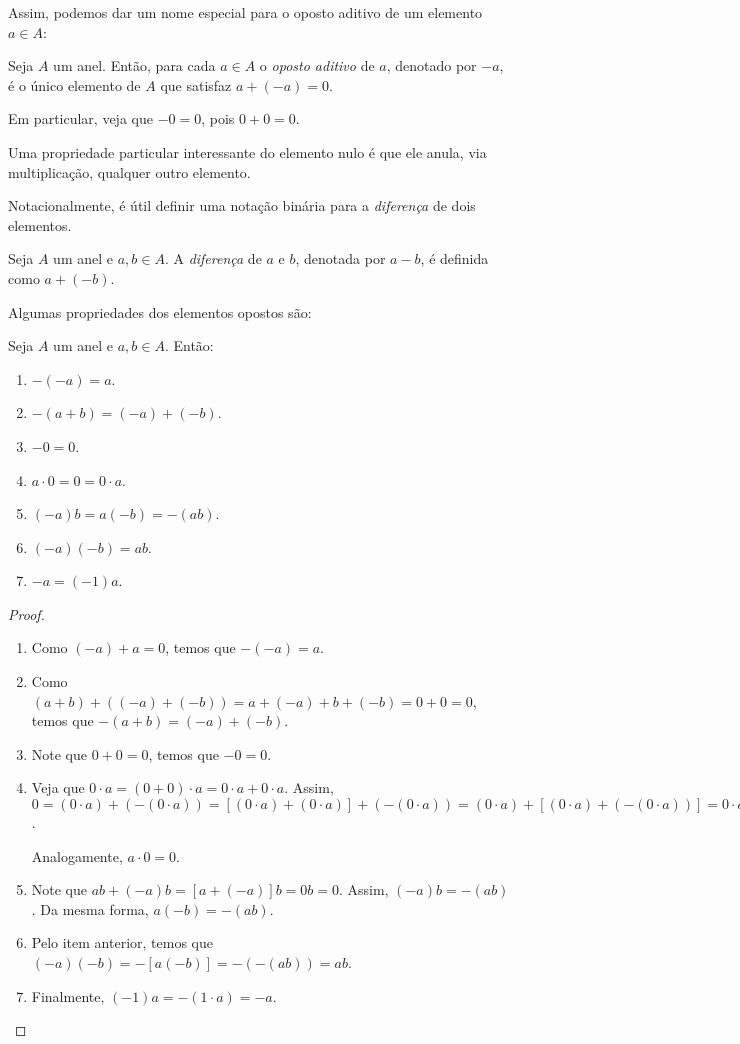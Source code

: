 Assim, podemos dar um nome especial para o oposto aditivo de um elemento $a \in A$:

\begin{definition}
    Seja $A$ um anel.
    Então, para cada $a \in A$ o \emph{oposto aditivo} de $a$, denotado por $-a$, é o único elemento de $A$ que satisfaz $a+(-a)=0$.

    Em particular, veja que $-0=0$, pois $0+0=0$.
\end{definition}


Uma propriedade particular interessante do elemento nulo é que ele anula, via multiplicação, qualquer outro elemento.

Notacionalmente, é útil definir uma notação binária para a \emph{diferença} de dois elementos.

\begin{definition}[Diferença]
    Seja $A$ um anel e $a, b \in A$.
    A \emph{diferença} de $a$ e $b$, denotada por $a-b$, é definida como $a+(-b)$.
\end{definition}
Algumas propriedades dos elementos opostos são:
\begin{proposition}
    Seja $A$ um anel e $a, b \in A$.
    Então:
    \begin{enumerate}[label=(\roman*)]
        \item $-(-a)=a$.
        \item $-(a+b)=(-a)+(-b)$.
        \item $-0=0$.
        \item $a\cdot 0=0=0\cdot a$.
        \item $(-a)b=a(-b)=-(ab)$.
        \item $(-a)(-b)=ab$.
        \item $-a=(-1)a$.
    \end{enumerate}
\end{proposition}
\begin{proof}
        \begin{enumerate}[label=(\roman*)]
        \item Como $(-a)+a=0$, temos que $-(-a)=a$.
        \item Como $(a+b)+((-a)+(-b))=a+(-a)+b+(-b)=0+0=0$, temos que $-(a+b)=(-a)+(-b)$.
        \item Note que $0+0=0$, temos que $-0=0$.
        \item Veja que $0\cdot a=(0+0)\cdot a=0\cdot a+0\cdot a$.
        Assim, $0=(0\cdot a)+(-(0\cdot a))=[(0\cdot a)+(0\cdot a)]+(-(0\cdot a))=(0\cdot a)+[(0\cdot a)+(-(0\cdot a))]=0\cdot a$.

        Analogamente, $a\cdot 0=0$.
        \item Note que $ab+(-a)b=[a+(-a)]b=0b=0$.
        Assim, $(-a)b=-(ab)$.
        Da mesma forma, $a(-b)=-(ab)$.
        \item Pelo item anterior, temos que $(-a)(-b)=-[a(-b)]=-(-(ab))=ab$.
        \item Finalmente, $(-1)a=-(1\cdot a)=-a$.
    \end{enumerate}
\end{proof}

